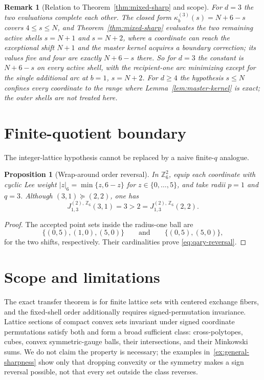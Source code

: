 \documentclass[pdflatex,sn-mathphys-num]{sn-jnl}
\theoremstyle{thmstyleone}
\newtheorem{proposition}[theorem]{Proposition}
\theoremstyle{thmstylethree}
\theoremstyle{thmstyletwo}
\newtheorem*{namedremark}{Remark}
\newcommand{\Z}{\mathbb Z}
\begin{document}
\begin{namedremark}[Relation to Theorem~\ref{thm:mixed-sharp} and scope]
For $d=3$ the two evaluations complete each other.  The closed form
$\kappa_b^{(3)}(s)=N+6-s$ covers $4\le s\le N$, and
Theorem~\ref{thm:mixed-sharp} evaluates the two remaining active shells
$s=N+1$ and $s=N+2$, where a coordinate can reach the exceptional shift $N+1$
and the master kernel acquires a boundary correction; its values five and four
are exactly $N+6-s$ there.  So for $d=3$ the constant is $N+6-s$ on every
active shell, with the recipient-one arc minimizing except for the single
additional arc at $b=1$, $s=N+2$.  For $d\ge4$ the hypothesis $s\le N$
confines every coordinate to the range where Lemma~\ref{lem:master-kernel} is
exact; the outer shells are not treated here.
\end{namedremark}

\section{Finite-quotient boundary}
\label{sec:quotient-boundary}

The integer-lattice hypothesis cannot be replaced by a naive finite-$q$
analogue.

\begin{proposition}[Wrap-around order reversal]
In $\Z_6^2$, equip each coordinate with cyclic Lee weight
$|z|_6=\min\{z,6-z\}$ for $z\in\{0,\ldots,5\}$, and take radii $p=1$ and
$q=3$.  Although $(3,1)\succeq(2,2)$, one has
\begin{equation}
 J_{1,3}^{(2),\,\Z_6}(3,1)=3
 >2=J_{1,3}^{(2),\,\Z_6}(2,2).                       \label{eq:qary-reversal}
\end{equation}
\end{proposition}

\begin{proof}
The accepted point sets inside the radius-one ball are
\[
 \{(0,5),(1,0),(5,0)\}
 \qquad\text{and}\qquad
 \{(0,5),(5,0)\},
\]
for the two shifts, respectively.  Their cardinalities prove
\eqref{eq:qary-reversal}.
\end{proof}


\section{Scope and limitations}
\label{sec:limits}

The exact transfer theorem is for finite lattice sets with centered exchange
fibers, and the fixed-shell order additionally requires signed-permutation
invariance.  Lattice sections of compact convex sets invariant under signed
coordinate permutations satisfy both and form a broad sufficient class:
cross-polytopes, cubes, convex symmetric-gauge balls, their intersections, and
their Minkowski sums.  We do not claim the property is necessary; the examples
in~\ref{ex:general-sharpness} show only that dropping convexity or the symmetry
makes a sign reversal possible, not that every set outside the class reverses.
\end{document}
